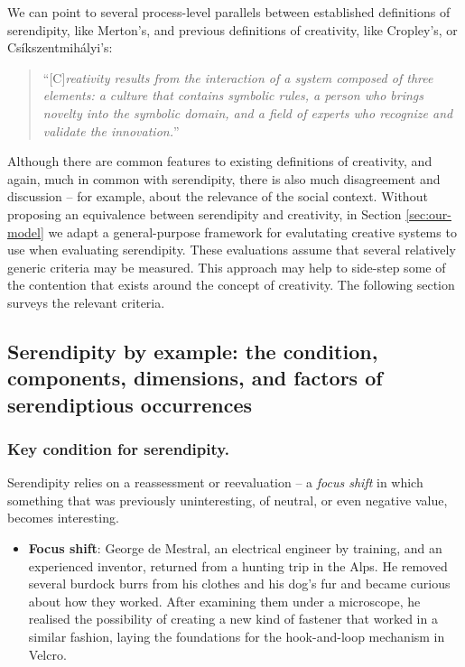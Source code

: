 We can point to several process-level parallels between
established definitions of serendipity, like Merton's, and previous
definitions of creativity, like Cropley's, or Cs\'ikszentmih\'alyi's:
\begin{quote}
``{[}C{]}\emph{reativity results from the interaction of a system
    composed of three elements: a culture that contains symbolic
    rules, a person who brings novelty into the symbolic domain, and a
    field of experts who recognize and validate the innovation.}''
  \cite[p.~6]{csikszentmihalyi1997flow}
\end{quote}
Although there are common features to existing definitions of
creativity, and again, much in common with serendipity,
there is also much disagreement and discussion -- for example,
about the relevance of the social context. 
%
Without proposing an equivalence between serendipity and creativity,
in Section \ref{sec:our-model} we adapt a general-purpose framework
for evalutating creative systems to use when evaluating serendipity.  These
evaluations assume that several relatively generic criteria may be
measured.  This approach may help to side-step some of the contention that
exists around the concept of creativity.
The following section surveys the relevant criteria.
 
%

\subsection{Serendipity by example: the condition, components, dimensions, and factors of serendiptious occurrences} \label{sec:by-example}


\subsubsection{Key condition for serendipity.}

Serendipity relies on a reassessment or reevaluation -- a \emph{focus shift} in which something that was previously uninteresting, of neutral, or even negative value, becomes interesting.

\begin{itemize}
\item \textbf{Focus shift}: George de Mestral, an electrical engineer
  by training, and an experienced inventor, returned from a hunting
  trip in the Alps.  He removed several burdock burrs from his clothes
  and his dog's fur and became curious about how they worked. After
  examining them under a microscope, he realised the possibility of
  creating a new kind of fastener that worked in a similar fashion,
  laying the foundations for the hook-and-loop mechanism in Velcro\texttrademark.
\end{itemize}

